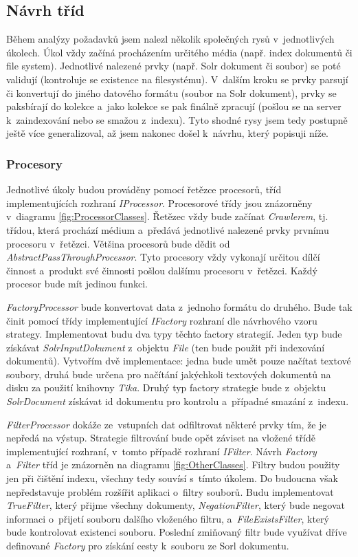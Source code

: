 \subsection{Návrh tříd}
Během analýzy požadavků jsem nalezl několik společných rysů v~jednotlivých úkolech. Úkol vždy začíná procházením určitého média (např. index dokumentů či file system). Jednotlivé nalezené prvky (např. Solr dokument či soubor) se poté validují (kontroluje se existence na filesystému). V~dalším kroku se prvky parsují či konvertují do jiného datového formátu (soubor na Solr dokument), prvky se paksbírají do kolekce a~jako kolekce se pak finálně zpracují (pošlou se na server k~zaindexování nebo se smažou z~indexu). Tyto shodné rysy jsem tedy postupně ještě více generalizoval, až jsem nakonec došel k~návrhu, který popisuji níže.

\subsubsection{Procesory}
Jednotlivé úkoly budou prováděny pomocí řetězce procesorů, tříd implementujících rozhraní \emph{IProcessor}.  Procesorové třídy jsou znázorněny v~diagramu \ref{fig:ProcessorClasses}. Řetězec vždy bude začínat \emph{Crawlerem}, tj. třídou, která prochází médium a~předává jednotlivé nalezené prvky prvnímu procesoru v~řetězci. Většina procesorů bude dědit od \emph{AbstractPassThroughProcessor}. Tyto procesory vždy vykonají určitou dílčí činnost a~produkt své činnosti pošlou dalšímu procesoru v~řetězci. Každý procesor bude mít jedinou funkci.

\emph{FactoryProcessor} bude konvertovat data z~jednoho formátu do druhého. Bude tak činit pomocí třídy implementující \emph{IFactory} rozhraní dle návrhového vzoru strategy. Implementovat budu dva typy těchto factory strategií. Jeden typ bude získávat \emph{SolrInputDokument} z~objektu \emph{File} (ten bude použit při indexování dokumentů). Vytvořím dvě implementace: jedna bude umět pouze načítat textové soubory, druhá bude určena pro načítání jakýchkoli textových dokumentů na disku za použití knihovny \emph{Tika}. Druhý typ factory strategie bude z~objektu \emph{SolrDocument} získávat id dokumentu pro kontrolu a~případné smazání z~indexu.

\emph{FilterProcessor} dokáže ze~vstupních dat odfiltrovat některé prvky tím, že je nepředá na výstup. Strategie filtrování bude opět záviset na vložené třídě implementující rozhraní, v~tomto případě rozhraní \emph{IFilter}. Návrh \emph{Factory} a~\emph{Filter} tříd je znázorněn na diagramu \ref{fig:OtherClasses}. Filtry budou použity jen při čištění indexu, všechny tedy souvísí s~tímto úkolem. Do budoucna však nepředstavuje problém rozšířit aplikaci o~filtry souborů. Budu implementovat \emph{TrueFilter}, který přijme všechny dokumenty, \emph{NegationFilter}, který bude negovat informaci o~přijetí souboru dalšího vloženého filtru, a~\emph{FileExistsFilter}, který bude kontrolovat existenci souboru. Poslední zmiňovaný filtr bude využívat dříve definované \emph{Factory} pro získání cesty k~souboru ze Sorl dokumentu.

